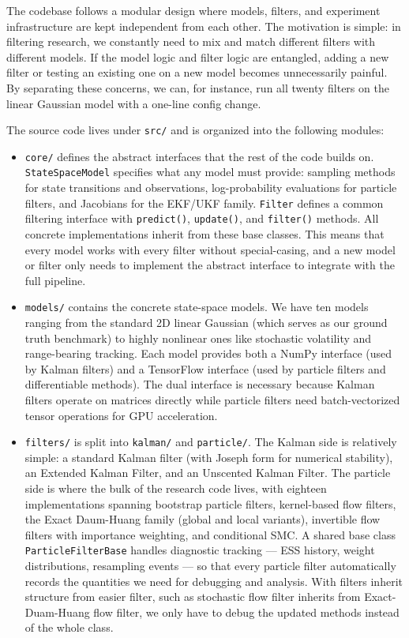 \documentclass{article}
\begin{document}
The codebase follows a modular design where models, filters, and experiment infrastructure are kept independent from each other. The motivation is simple: in filtering research, we constantly need to mix and match different filters with different models. If the model logic and filter logic are entangled, adding a new filter or testing an existing one on a new model becomes unnecessarily painful. By separating these concerns, we can, for instance, run all twenty filters on the linear Gaussian model with a one-line config change.

The source code lives under \texttt{src/} and is organized into the following modules:
\begin{itemize}
    \item \texttt{core/} defines the abstract interfaces that the rest of the code builds on. \texttt{StateSpaceModel} specifies what any model must provide: sampling methods for state transitions and observations, log-probability evaluations for particle filters, and Jacobians for the EKF/UKF family. \texttt{Filter} defines a common filtering interface with \texttt{predict()}, \texttt{update()}, and \texttt{filter()} methods. All concrete implementations inherit from these base classes. This means that every model works with every filter without special-casing, and a new model or filter only needs to implement the abstract interface to integrate with the full pipeline.
    \item \texttt{models/} contains the concrete state-space models. We have ten models ranging from the standard 2D linear Gaussian (which serves as our ground truth benchmark) to highly nonlinear ones like stochastic volatility and range-bearing tracking. Each model provides both a NumPy interface (used by Kalman filters) and a TensorFlow interface (used by particle filters and differentiable methods). The dual interface is necessary because Kalman filters operate on matrices directly while particle filters need batch-vectorized tensor operations for GPU acceleration.
    \item \texttt{filters/} is split into \texttt{kalman/} and \texttt{particle/}. The Kalman side is relatively simple: a standard Kalman filter (with Joseph form for numerical stability), an Extended Kalman Filter, and an Unscented Kalman Filter. The particle side is where the bulk of the research code lives, with eighteen implementations spanning bootstrap particle filters, kernel-based flow filters, the Exact Daum-Huang family (global and local variants), invertible flow filters with importance weighting, and conditional SMC. A shared base class \texttt{ParticleFilterBase} handles diagnostic tracking --- ESS history, weight distributions, resampling events --- so that every particle filter automatically records the quantities we need for debugging and analysis. With filters inherit structure from easier filter, such as stochastic flow filter inherits from Exact-Duam-Huang flow filter, we only have to debug the updated methods instead of the whole class.
    

\end{itemize}
\end{document}

